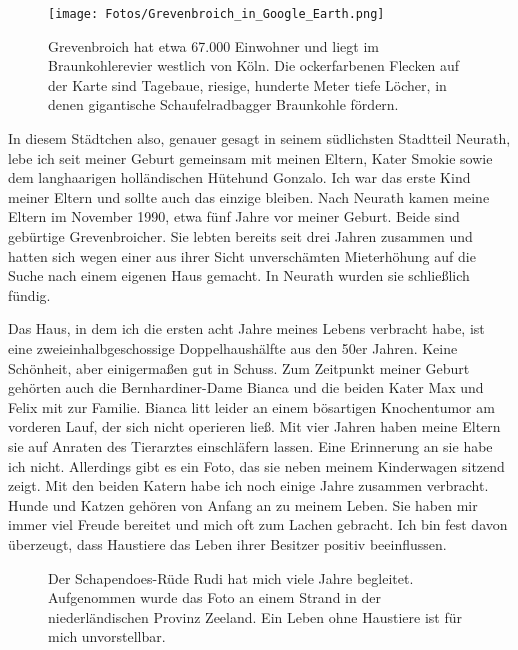\documentclass[fontsize=14pt,a4paper,headinclude,DIV=calc,automark]{scrbook}
\begin{document}
\begin{figure}[ht]
    \centering
    \texttt{[image: Fotos/Grevenbroich\_in\_Google\_Earth.png]}
    \caption{Grevenbroich hat etwa 67.000 Einwohner und liegt im Braunkohlerevier westlich von Köln. Die ockerfarbenen Flecken auf der Karte sind Tagebaue, riesige, hunderte Meter tiefe Löcher, in denen gigantische Schaufelradbagger Braunkohle fördern.}
    \label{fig:grevenbroich}
\end{figure}

In diesem Städtchen also, genauer gesagt in seinem südlichsten Stadtteil Neurath, lebe ich seit meiner Geburt gemeinsam mit meinen Eltern, Kater Smokie sowie dem langhaarigen holländischen Hütehund Gonzalo. Ich war das erste Kind meiner Eltern und sollte auch das einzige bleiben. Nach Neurath kamen meine Eltern im November 1990, etwa fünf Jahre vor meiner Geburt. Beide sind gebürtige Grevenbroicher. Sie lebten bereits seit drei Jahren zusammen und hatten sich wegen einer aus ihrer Sicht unverschämten Mieterhöhung auf die Suche nach einem eigenen Haus gemacht. In Neurath wurden sie schließlich fündig.

Das Haus, in dem ich die ersten acht Jahre meines Lebens verbracht habe, ist eine zweieinhalbgeschossige Doppelhaushälfte aus den 50er Jahren. Keine Schönheit, aber einigermaßen gut in Schuss. Zum Zeitpunkt meiner Geburt gehörten auch die Bernhardiner-Dame Bianca und die beiden Kater Max und Felix mit zur Familie. Bianca litt leider an einem bösartigen Knochentumor am vorderen Lauf, der sich nicht operieren ließ. Mit vier Jahren haben meine Eltern sie auf Anraten des Tierarztes einschläfern lassen. Eine Erinnerung an sie habe ich nicht. Allerdings gibt es ein Foto, das sie neben meinem Kinderwagen sitzend zeigt. Mit den beiden Katern habe ich noch einige Jahre zusammen verbracht. Hunde und Katzen gehören von Anfang an zu meinem Leben. Sie haben mir immer viel Freude bereitet und mich oft zum Lachen gebracht. Ich bin fest davon überzeugt, dass Haustiere das Leben ihrer Besitzer positiv beeinflussen.

\setlength{\fboxsep}{0pt}    %
\setlength{\fboxrule}{0.2pt} %
\begin{figure}[ht]
    \centering
    \caption{Der Schapendoes-Rüde Rudi hat mich viele Jahre begleitet. Aufgenommen wurde das Foto an einem Strand in der niederländischen Provinz Zeeland. Ein Leben ohne Haustiere ist für mich unvorstellbar.}
    \label{fig:zeltgemeinschaft}
\end{figure}
\end{document}
